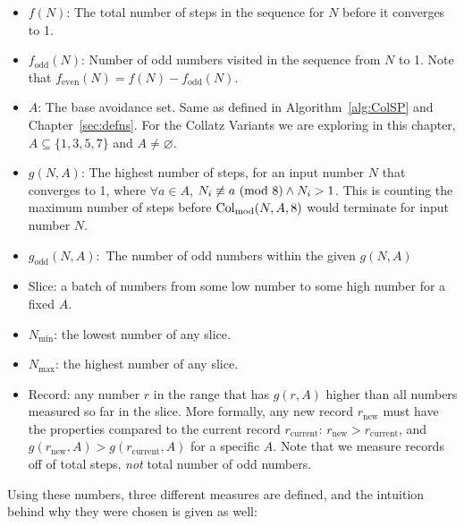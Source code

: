 \begin{itemize}
    \item $f(N)$: The total number of steps in the sequence for $N$ before it converges to 1.
    \item $f_\text{odd}(N)$: Number of odd numbers visited in the sequence from $N$ to 1. Note that $f_\text{even}(N) = f(N) - f_\text{odd}(N)$.
    \item $A$: The base avoidance set. Same as defined in Algorithm~\ref{alg:ColSP} and Chapter~\ref{sec:defns}. For the Collatz Variants we are exploring in this chapter, $A \subseteq \{1, 3, 5, 7\}$ and $A \ne \varnothing$.
    \item $g(N,A)$: The highest number of steps, for an input number $N$ that converges to 1, where $\forall a \in A$, $N_i \not\equiv a \ (\mathrm{mod}\ 8) \wedge N_i > 1$. This is counting the maximum number of steps before $\mathrm{Col}_{\text{mod}}(N,A,8)$ would terminate for input number $N$.
    \item $g_\text{odd}(N,A):$ The number of odd numbers within the given $g(N,A)$
    \item Slice: a batch of numbers from some low number to some high number for a fixed $A$.
    \item $N_{\min}$: the lowest number of any slice.
    \item $N_{\max}$: the highest number of any slice.

    \item Record: any number $r$ in the range that has $g(r,A)$ higher than all numbers measured so far in the slice. More formally, any new record $r_\text{new}$ must have the properties compared to the current record $r_\text{current}$: $r_\text{new} > r_\text{current}$, and $g(r_\text{new},A) > g(r_\text{current},A)$ for a specific $A$. Note that we measure records off of total steps, \textit{not} total number of odd numbers.
      
\end{itemize}
Using these numbers, three different measures are defined, and the intuition behind why they were chosen is given as well: \par
